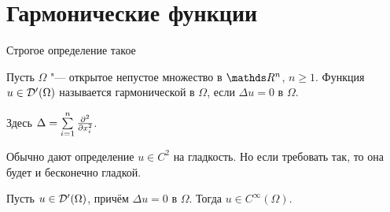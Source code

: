 \section{Гармонические функции}

Строгое определение такое
\begin{Def}
  Пусть $\Omega$ "--- открытое непустое множество в $\R^n$, $n\ge 1$. Функция $u\in \mathcal D'(\Omega)$ называется гармонической в $\Omega$, если $\Delta u=0$ в $\Omega$.

Здесь $\Delta = \sum\limits_{i = 1}^{n}\frac{\partial ^2}{\partial x_i^2}$.
\end{Def}

Обычно дают определение $u\in C^2$ на гладкость. Но если требовать так, то она будет и бесконечно гладкой.

\begin{The}
  Пусть $u\in \mathcal D'(\Omega)$, причём $\Delta u = 0$ в $\Omega$. Тогда $u\in C^\infty(\Omega)$.
\end{The}
